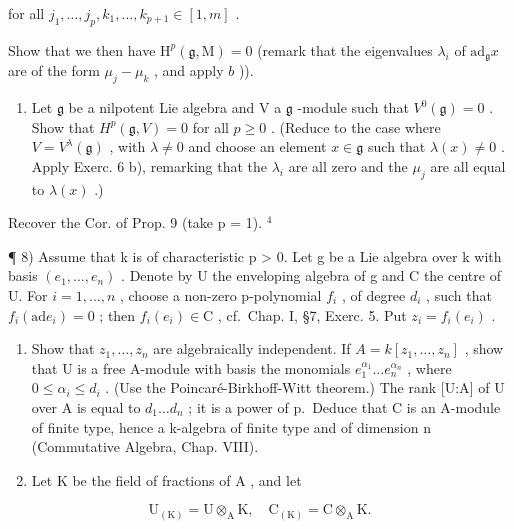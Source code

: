 for all \(j_{1},\ldots,j_{p},k_{1},\ldots,k_{p+1}\in[1,m]\) .

Show that we then have \(\mathrm{H}^p (\mathfrak{g},\mathrm{M}) = 0\) (remark that the eigenvalues \(\lambda_{i}\) of \(\mathrm{ad}_{\mathfrak{g}}x\) are of the form \(\mu_j - \mu_k\) , and apply \(b\) )).

\begin{enumerate}
\def\labelenumi{\arabic{enumi})}
\setcounter{enumi}{6}
\tightlist
\item
  Let \(\mathfrak{g}\) be a nilpotent Lie algebra and V a \(\mathfrak{g}\) -module such that \(V^0(\mathfrak{g}) = 0\) . Show that \(H^p(\mathfrak{g}, V) = 0\) for all \(p \geq 0\) . (Reduce to the case where \(V = V^\lambda(\mathfrak{g})\) , with \(\lambda \neq 0\) and choose an element \(x \in \mathfrak{g}\) such that \(\lambda(x) \neq 0\) . Apply Exerc. 6 b), remarking that the \(\lambda_i\) are all zero and the \(\mu_j\) are all equal to \(\lambda(x)\) .)
\end{enumerate}

Recover the Cor. of Prop. 9 (take p = 1). \(^{4}\)

¶ 8) Assume that k is of characteristic p \textgreater{} 0. Let g be a Lie algebra over k with basis \((e_{1},\ldots,e_{n})\) . Denote by U the enveloping algebra of g and C the centre of U. For \(i = 1,\ldots,n\) , choose a non-zero p-polynomial \(f_{i}\) , of degree \(d_{i}\) , such that \(f_{i}(\mathrm{ad}e_{i}) = 0\) ; then \(f_{i}(e_{i}) \in \mathrm{C}\) , cf.~Chap. I, §7, Exerc. 5. Put \(z_{i} = f_{i}(e_{i})\) .

\begin{enumerate}
\def\labelenumi{\alph{enumi})}
\item
  Show that \(z_{1},\ldots,z_{n}\) are algebraically independent. If \(A=k[z_{1},\ldots,z_{n}]\) , show that U is a free A-module with basis the monomials \(e_{1}^{\alpha_{1}}\ldots e_{n}^{\alpha_{n}}\) , where \(0\leq\alpha_{i}\leq d_{i}\) . (Use the Poincaré-Birkhoff-Witt theorem.) The rank {[}U:A{]} of U over A is equal to \(d_{1}\ldots d_{n}\) ; it is a power of p.~Deduce that C is an A-module of finite type, hence a k-algebra of finite type and of dimension n (Commutative Algebra, Chap. VIII).
\item
  Let \(\mathrm{K}\) be the field of fractions of \(\mathrm{A}\) , and let
\end{enumerate}

\[
\mathrm{U} _ {(\mathrm{K})} = \mathrm{U} \otimes_ {\mathrm{A}} \mathrm{K}, \quad \mathrm{C} _ {(\mathrm{K})} = \mathrm{C} \otimes_ {\mathrm{A}} \mathrm{K}.
\]

